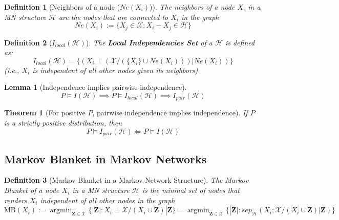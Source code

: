 \documentclass[11pt]{article}
\numberwithin{equation}{section}
\DeclareMathOperator*{\argmin}{argmin}
\theoremstyle{boldStyle}
\theoremstyle{boldBlueStyle}
\newtheorem{lemma}{Lemma}[section]
\theoremstyle{boldPurpleStyle}
\newtheorem{theorem}{Theorem}[section]
\theoremstyle{boldRedStyle}
\newtheorem{definition}{Definition}[section]
\begin{document}
\begin{definition}[Neighbors of a node ($Ne(X_i)$)]
    The neighbors of a node $X_i$ in a MN structure $\mathcal{H}$ are the nodes that are connected to $X_i$ in the graph
    \begin{equation*}
        Ne(X_i) := \{ X_j \in \mathcal{X} : X_i - X_j \in \mathcal{H} \}
    \end{equation*}
\end{definition}

\begin{definition}[$I_{local}(\mathcal{H})$]
    The \textbf{Local Independencies Set} of a $\mathcal{H}$ is defined as:
    \begin{equation*}
        I_{local}(\mathcal{H}) = \{ (X_i \perp ( \mathcal{X} / ( \{ X_i \} \cup Ne(X_i) ) ) | Ne(X_i)) \}
    \end{equation*}
    (i.e., $X_i$ is independent of all other nodes given its neighbors)
\end{definition}

\begin{lemma}[Independence implies pairwise independence]
    \[
        P \models I(\mathcal{H}) \implies  P \models I_{local}(\mathcal{H}) \implies I_{pair}(\mathcal{H})  
    \]
\end{lemma}

\begin{theorem}[For positive $P$, pairwise independence implies independence]
    If $P$ is a strictly positive distribution, then
    \[
        P \models I_{pair}(\mathcal{H}) \Leftrightarrow P \models I(\mathcal{H})
    \]
\end{theorem}


\subsection{Markov Blanket in Markov Networks}

\begin{definition}[Markov Blanket in a Markov Network Structure]
    The Markov Blanket of a node $X_i$ in a MN structure $\mathcal{H}$ is the mininal set of nodes that renders $X_i$ independent of all other nodes in the graph
    \begin{equation*}
        \text{MB}(X_i) := \argmin_{\textbf{Z} \in \mathcal{X}} \{ |\textbf{Z}| : X_i \perp \mathcal{X} / ({X_i} \cup \textbf{Z}) | \textbf{Z} \} 
        = \argmin_{\textbf{Z} \in \mathcal{X}} \{ |\textbf{Z}| : sep_{\mathcal{H}}(X_i; \mathcal{X} / ({X_i} \cup \textbf{Z}) | \textbf{Z}) \}
    \end{equation*}
\end{definition}
\end{document}
